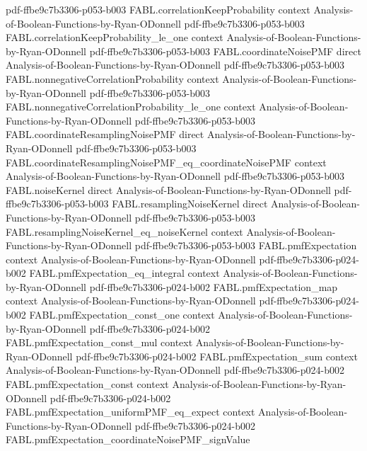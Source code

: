 \begin{theorem}
  {pdf-ffbe9c7b3306-p053-b003}
\proofstep
  {FABL.correlationKeepProbability}
  {context}
  {Analysis-of-Boolean-Functions-by-Ryan-ODonnell}
  {pdf-ffbe9c7b3306-p053-b003}
\proofstep
  {FABL.correlationKeepProbability_le_one}
  {context}
  {Analysis-of-Boolean-Functions-by-Ryan-ODonnell}
  {pdf-ffbe9c7b3306-p053-b003}
\proofstep
  {FABL.coordinateNoisePMF}
  {direct}
  {Analysis-of-Boolean-Functions-by-Ryan-ODonnell}
  {pdf-ffbe9c7b3306-p053-b003}
\proofstep
  {FABL.nonnegativeCorrelationProbability}
  {context}
  {Analysis-of-Boolean-Functions-by-Ryan-ODonnell}
  {pdf-ffbe9c7b3306-p053-b003}
\proofstep
  {FABL.nonnegativeCorrelationProbability_le_one}
  {context}
  {Analysis-of-Boolean-Functions-by-Ryan-ODonnell}
  {pdf-ffbe9c7b3306-p053-b003}
\proofstep
  {FABL.coordinateResamplingNoisePMF}
  {direct}
  {Analysis-of-Boolean-Functions-by-Ryan-ODonnell}
  {pdf-ffbe9c7b3306-p053-b003}
\proofstep
  {FABL.coordinateResamplingNoisePMF_eq_coordinateNoisePMF}
  {context}
  {Analysis-of-Boolean-Functions-by-Ryan-ODonnell}
  {pdf-ffbe9c7b3306-p053-b003}
\proofstep
  {FABL.noiseKernel}
  {direct}
  {Analysis-of-Boolean-Functions-by-Ryan-ODonnell}
  {pdf-ffbe9c7b3306-p053-b003}
\proofstep
  {FABL.resamplingNoiseKernel}
  {direct}
  {Analysis-of-Boolean-Functions-by-Ryan-ODonnell}
  {pdf-ffbe9c7b3306-p053-b003}
\proofstep
  {FABL.resamplingNoiseKernel_eq_noiseKernel}
  {context}
  {Analysis-of-Boolean-Functions-by-Ryan-ODonnell}
  {pdf-ffbe9c7b3306-p053-b003}
\proofstep
  {FABL.pmfExpectation}
  {context}
  {Analysis-of-Boolean-Functions-by-Ryan-ODonnell}
  {pdf-ffbe9c7b3306-p024-b002}
\proofstep
  {FABL.pmfExpectation_eq_integral}
  {context}
  {Analysis-of-Boolean-Functions-by-Ryan-ODonnell}
  {pdf-ffbe9c7b3306-p024-b002}
\proofstep
  {FABL.pmfExpectation_map}
  {context}
  {Analysis-of-Boolean-Functions-by-Ryan-ODonnell}
  {pdf-ffbe9c7b3306-p024-b002}
\proofstep
  {FABL.pmfExpectation_const_one}
  {context}
  {Analysis-of-Boolean-Functions-by-Ryan-ODonnell}
  {pdf-ffbe9c7b3306-p024-b002}
\proofstep
  {FABL.pmfExpectation_const_mul}
  {context}
  {Analysis-of-Boolean-Functions-by-Ryan-ODonnell}
  {pdf-ffbe9c7b3306-p024-b002}
\proofstep
  {FABL.pmfExpectation_sum}
  {context}
  {Analysis-of-Boolean-Functions-by-Ryan-ODonnell}
  {pdf-ffbe9c7b3306-p024-b002}
\proofstep
  {FABL.pmfExpectation_const}
  {context}
  {Analysis-of-Boolean-Functions-by-Ryan-ODonnell}
  {pdf-ffbe9c7b3306-p024-b002}
\proofstep
  {FABL.pmfExpectation_uniformPMF_eq_expect}
  {context}
  {Analysis-of-Boolean-Functions-by-Ryan-ODonnell}
  {pdf-ffbe9c7b3306-p024-b002}
\proofstep
  {FABL.pmfExpectation_coordinateNoisePMF_signValue}

\end{theorem}
